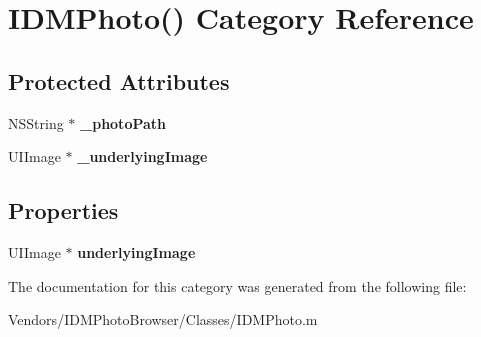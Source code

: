 \hypertarget{category_i_d_m_photo_07_08}{}\section{I\+D\+M\+Photo() Category Reference}
\label{category_i_d_m_photo_07_08}
\subsection*{Protected Attributes}
\begin{DoxyCompactItemize}
\item 
\hypertarget{category_i_d_m_photo_07_08_a6c34a421cf5c271a538675b9e870c8bf}{}N\+S\+String $\ast$ {\bfseries \+\_\+photo\+Path}\label{category_i_d_m_photo_07_08_a6c34a421cf5c271a538675b9e870c8bf}

\item 
\hypertarget{category_i_d_m_photo_07_08_a43298e513c72839bcf4b0b0aa7f9a868}{}U\+I\+Image $\ast$ {\bfseries \+\_\+underlying\+Image}\label{category_i_d_m_photo_07_08_a43298e513c72839bcf4b0b0aa7f9a868}

\end{DoxyCompactItemize}
\subsection*{Properties}
\begin{DoxyCompactItemize}
\item 
\hypertarget{category_i_d_m_photo_07_08_a413cbff38bfe1203e576c47270830461}{}U\+I\+Image $\ast$ {\bfseries underlying\+Image}\label{category_i_d_m_photo_07_08_a413cbff38bfe1203e576c47270830461}

\end{DoxyCompactItemize}


The documentation for this category was generated from the following file\+:\begin{DoxyCompactItemize}
\item 
Vendors/\+I\+D\+M\+Photo\+Browser/\+Classes/I\+D\+M\+Photo.\+m\end{DoxyCompactItemize}

